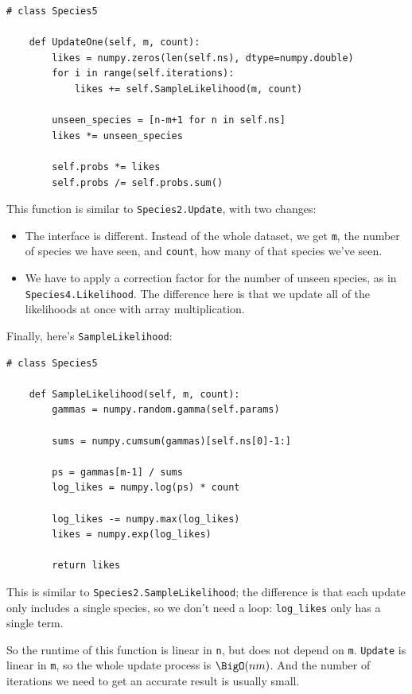 \documentclass[12pt]{book}
\begin{document}
\begin{verbatim}
# class Species5

    def UpdateOne(self, m, count):
        likes = numpy.zeros(len(self.ns), dtype=numpy.double)
        for i in range(self.iterations):
            likes += self.SampleLikelihood(m, count)

        unseen_species = [n-m+1 for n in self.ns]
        likes *= unseen_species

        self.probs *= likes
        self.probs /= self.probs.sum()
\end{verbatim}

This function is similar to {\tt Species2.Update}, with two changes:

\begin{itemize}

\item The interface is different.  Instead of the whole dataset,
we get {\tt m}, the number
of species we have seen, and {\tt count}, how many of that
species we've seen.

\item We have to apply a correction factor for the number
of unseen species, as in {\tt Species4.Likelihood}.  The difference
here is that we update all of the likelihoods at once with
array multiplication.

\end{itemize}

Finally, here's {\tt SampleLikelihood}:

\begin{verbatim}
# class Species5

    def SampleLikelihood(self, m, count):
        gammas = numpy.random.gamma(self.params)

        sums = numpy.cumsum(gammas)[self.ns[0]-1:]

        ps = gammas[m-1] / sums
        log_likes = numpy.log(ps) * count

        log_likes -= numpy.max(log_likes)
        likes = numpy.exp(log_likes)

        return likes
\end{verbatim}

This is similar to {\tt Species2.SampleLikelihood}; the
difference is that each update only includes a single species,
so we don't need a loop: \verb"log_likes" only has a single term.

So the runtime of this function is linear in {\tt n}, but does not
depend on {\tt m}.  {\tt Update} is linear in {\tt m}, so the
whole update process is $\BigO(n m)$.  And the number of iterations
we need to get an accurate result is usually small.
\end{document}
